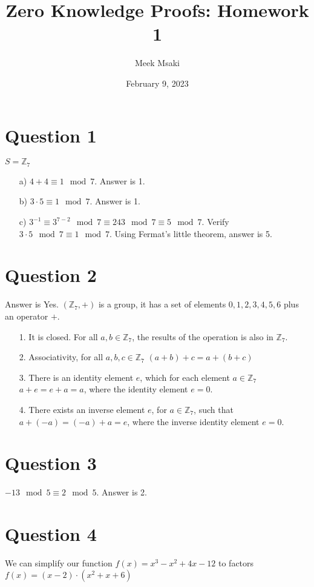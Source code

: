 \documentclass{article}
\title{Zero Knowledge Proofs: Homework 1}
\author{Meek Msaki}
\date{February 9, 2023}
\begin{document}
\maketitle

\section*{Question 1}
$S=\mathbb{Z}_7$
\begin{itemize}
    \item[a)] $4+4 \equiv 1 \mod 7$. Answer is 1.
    \item[b)] $3\cdot5 \equiv 1 \mod 7$. Answer is 1.
    \item[c)] $3^{-1} \equiv 3^{7-2} \mod 7 \equiv 243 \mod 7 \equiv 5 \mod 7$. Verify $3\cdot5 \mod7 \equiv 1 \mod 7$. Using Fermat's little theorem, answer is 5.
\end{itemize}

\section*{Question 2}
Answer is Yes. $(\mathbb{Z}_7, +)$ is a group, it has a set of elements ${0,1,2,3,4,5,6}$ plus an operator $+$. 

\begin{itemize}
    \item[1.]It is closed. For all $a,b \in \mathbb Z_7$, the results of the operation is also in $\mathbb Z_7$.
    \item[2.]Associativity, for all $a,b,c \in \mathbb Z_7$ $(a+b)+c=a+(b+c)$
    \item[3.]There is an identity element $e$, which for each element $a\in \mathbb{Z}_7$  $a+e=e+a=a$, where the identity element $e=0$.
    \item[4.]There exists an inverse element $e$, for $a \in \mathbb Z_7$, such that $a+(-a)=(-a)+a=e$, where the inverse identity element $e=0$.
\end{itemize} 

\section*{Question 3}
$-13 \mod 5 \equiv 2 \mod 5$. Answer is 2.

\section*{Question 4}

We can simplify our function $f(x) = x^{3}-x^{2}+4x-12$ to factors $f(x)= (x-2)\cdot (x^{2}+x+6)$
\end{document}
